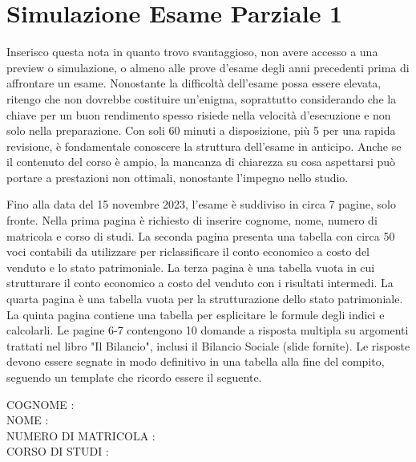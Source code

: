 \documentclass{article}
\begin{document}
\newpage
\section{Simulazione Esame Parziale 1}
Inserisco questa nota in quanto trovo svantaggioso, non avere accesso a una preview o simulazione, o almeno alle prove d'esame degli anni precedenti prima di affrontare un esame. Nonostante la difficoltà dell'esame possa essere elevata, ritengo che non dovrebbe costituire un'enigma, soprattutto considerando che la chiave per un buon rendimento spesso risiede nella velocità d'esecuzione e non solo nella preparazione. Con soli 60 minuti a disposizione, più 5 per una rapida revisione, è fondamentale conoscere la struttura dell'esame in anticipo. Anche se il contenuto del corso è ampio, la mancanza di chiarezza su cosa aspettarsi può portare a prestazioni non ottimali, nonostante l'impegno nello studio.

Fino alla data del 15 novembre 2023, l'esame è suddiviso in circa 7 pagine, solo fronte. Nella prima pagina è richiesto di inserire cognome, nome, numero di matricola e corso di studi. La seconda pagina presenta una tabella con circa 50 voci contabili da utilizzare per riclassificare il conto economico a costo del venduto e lo stato patrimoniale. La terza pagina è una tabella vuota in cui strutturare il conto economico a costo del venduto con i risultati intermedi. La quarta pagina è una tabella vuota per la strutturazione dello stato patrimoniale. La quinta pagina contiene una tabella per esplicitare le formule degli indici e calcolarli. Le pagine 6-7 contengono 10 domande a risposta multipla su argomenti trattati nel libro "Il Bilancio", inclusi il Bilancio Sociale (slide fornite). Le risposte devono essere segnate in modo definitivo in una tabella alla fine del compito, seguendo un template che ricordo essere il seguente.

\newpage

\begin{table}[ht]
    \Huge{
        COGNOME : \\
        NOME : \\
        NUMERO DI MATRICOLA : \\
        CORSO DI STUDI : \\
    }
\end{table}
\end{document}
